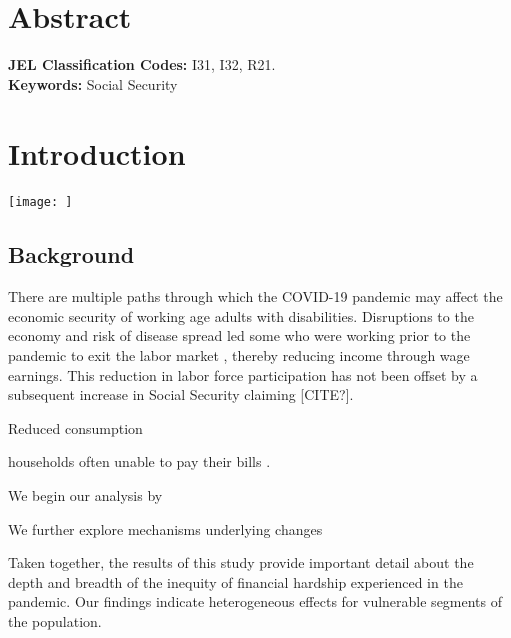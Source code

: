\documentclass[12pt]{article}
\begin{document}
\cleardoublepage{}

\linespread{1.25} 
\section*{Abstract}
		\noindent   
		
				\noindent\textbf{JEL Classification Codes:} I31, I32, R21. \\
		\noindent\textbf{Keywords:}    Social Security\\

\newpage 
 
\section{Introduction}


\texttt{[image: ]}


\subsection{Background}

 
 
 
There are multiple paths through which the COVID-19 pandemic may affect the economic security of working age adults with disabilities. Disruptions to the economy and risk of disease spread led some who were working prior to the pandemic to exit the labor market \citep{cheng2020back, goda2021impact moen2020disparate, quinby2021older }, thereby reducing income through wage earnings. This reduction in labor force participation has not been offset by a subsequent increase in Social Security  claiming [CITE?].   


Reduced consumption \citep{baker2020does,horvath2021covid} 

households often unable to pay their bills \citep{clark2021financial,schneider2020household}. 

  
We begin our analysis by  

We further explore mechanisms underlying changes 

 

Taken together, the results of this study provide important detail about the depth and breadth of the inequity of financial hardship experienced in the pandemic. Our findings indicate heterogeneous effects for vulnerable segments of the population.    


\cite{adams2020inequality,andersen2020consumer,andersen2020pandemic,baker2020does,bhutta2020covid,braxton2020can,brewer2020initial,casado2020aggregate,cheng2020back,cherry2021government,chetty2020did,clark2021financial,coibion2020labor,cfpb2020,cowan2020short,cutts2020musings,emerson2021impact,enriquez2020covid,farrell2020consumption,findling2021serious,gerardi2021racial,gignac2021impacts,goda2022impact,goda2021impact,grantz2020use,haughwout2020us,horvath2021covid,li2020impact,loibl2020role,lusardi20186,moen2020disparate,mullen2022economic,quinby2021older,schneider2020household,schur2021covid,stavins2021unprepared}
\end{document}
